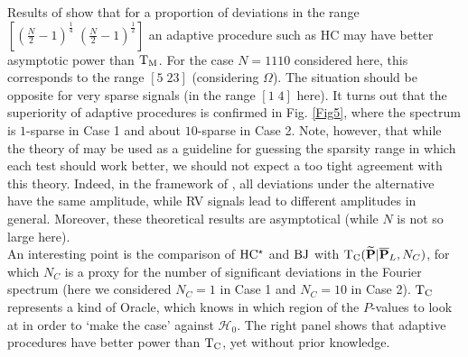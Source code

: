 \documentclass[journal]{IEEEtran}
\begin{document}
{ Results of \cite{Donoho_2004} show that for a proportion of deviations in the range $ [(\frac{N}{2}-1)^{\frac{1}{4}}\; (\frac{N}{2}-1)^{\frac{1}{2}}]$ an adaptive procedure such as HC may have better asymptotic power  than $\rm T_M$. For the case $N=1110$ considered here,  this corresponds to the range $[5\;23]$ (considering $\Omega$). The situation should be opposite  for  very sparse signals (in the range  $ [1\; 4]$ here). It turns out that the superiority of adaptive procedures is confirmed in Fig. \ref{Fig5}, 
 where the spectrum is $1$-sparse in Case 1 and about $10$-sparse in Case 2.
Note, however, that while the theory of  \cite{Donoho_2004} may be used as a guideline for guessing the  sparsity range in which each test should work better,  we should not expect a too tight agreement with  this theory. Indeed, in the framework of \cite{Donoho_2004},
all deviations under the alternative have the same amplitude, while RV signals lead to  different amplitudes in general. Moreover, these theoretical results are asymptotical (while  $N$ is not so large here).\\
 An interesting point is the comparison of $\rm HC^\star$ and $\rm BJ$ with ${\rm T_C}({\bf \widetilde{\bf P}}|\overline{\bf P}_L,N_C)$, for which $N_C$ is a proxy for the number of significant deviations in the Fourier spectrum (here we considered $N_C=1$ in Case 1 and $N_C=10$ in Case 2). ${\rm T_C}$ represents a  kind of Oracle, which knows  in which region of the $P$-values to look at in order to `make the case' against $\mathcal{H}_0$. The right panel shows that adaptive procedures  have better power  than ${\rm T_C}$, yet without prior knowledge.}
 
\end{document}
